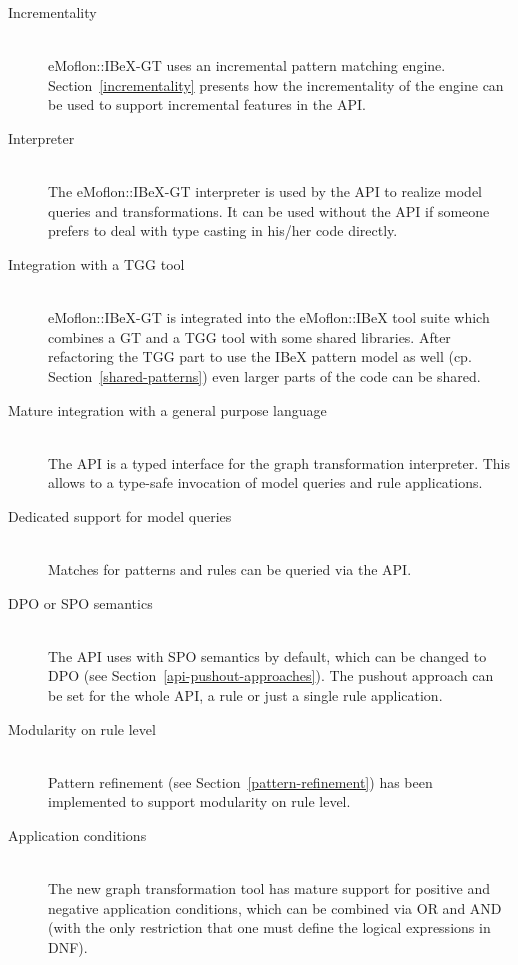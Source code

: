 \begin{description}
	\item[Incrementality] ~\\
		eMoflon::IBeX-GT uses an incremental pattern matching engine.
		Section~\ref{incrementality} presents how the incrementality of the engine can be used to support incremental features in the API.

	\item[Interpreter] ~\\
		The eMoflon::IBeX-GT interpreter is used by the API to realize model queries and transformations.
		It can be used without the API if someone prefers to deal with type casting in his/her code directly.

	\item[Integration with a TGG tool] ~\\
		eMoflon::IBeX-GT is integrated into the eMoflon::IBeX tool suite which combines a GT and a TGG tool with some shared libraries.
		After refactoring the TGG part to use the IBeX pattern model as well (cp. Section~\ref{shared-patterns}) even larger parts of the code can be shared.

	\item[Mature integration with a general purpose language] ~\\
		The API is a typed interface for the graph transformation interpreter.
		This allows to a type-safe invocation of model queries and rule applications.

	\item[Dedicated support for model queries] ~\\
		Matches for patterns and rules can be queried via the API.

	\item[DPO or SPO semantics] ~\\
		The API uses with SPO semantics by default, which can be changed to DPO (see Section~\ref{api-pushout-approaches}).
		The pushout approach can be set for the whole API, a rule or just a single rule application.

	\item[Modularity on rule level] ~\\
		Pattern refinement (see Section~\ref{pattern-refinement}) has been implemented to support modularity on rule level.

	\item[Application conditions] ~\\
		The new graph transformation tool has mature support for positive and negative application conditions, which can be combined via OR and AND (with the only restriction that one must define the logical expressions in DNF).
	

\end{description}
